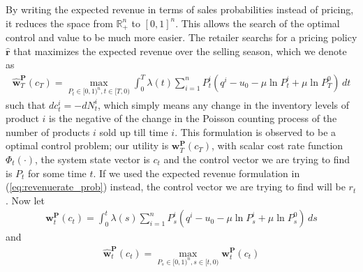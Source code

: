 By writing the expected revenue in terms of sales probabilities instead of pricing, it reduces the space from $\mathbb{R}^n_+$ to $[0,1]^n$. This allows the search of the 	optimal control and value to be much more easier. The retailer searchs for a pricing policy $\hat{\mathbf{r}}$ that maximizes the expected revenue over the selling season, which we denote as
\begin{align}
\hat{\mathbf{w}}_T^{\mathbf{P}}(c_T) = \max_{P_t \in [0,1)^n, t \in [T,0)}\int_{0}^{T}\lambda(t)\sum_{i=1}^{n}P_t^i\left(q^i-u_0-\mu \ln P_t^i+\mu \ln P_T^0\right)\, dt
\end{align}
such that $dc_t^i = -dN_t^i$, which simply means any change in the inventory levels of product $i$ is the negative of the change in the Poisson counting process of the number of products $i$ sold up till time $i$. This formulation is observed to be a optimal control problem; our utility is $\mathbf{w}_T^{\mathbf{P}}(c_T)$, with scalar cost rate function $\Phi_t(\cdot)$, the system state vector is $c_t$ and the control vector we are trying to find is $P_t$ for some time $t$. If we used the expected revenue formulation in (\ref{eq:revenuerate_prob}) instead, the control vector we are trying to find will be $r_t$. Now let
\begin{align}
\mathbf{w}_t^{\mathbf{P}}(c_t) = \int_{0}^{t}\lambda(s)\sum_{i=1}^{n}P_s^i\left(q^i-u_0-\mu \ln P_s^i+\mu \ln P_s^0\right)\, ds
\end{align}
and 
\begin{align}
\hat{\mathbf{w}}_t^{\mathbf{P}}(c_t) = \max_{P_s \in [0,1)^n, s \in [t,0)} \mathbf{w}_t^{\mathbf{P}}(c_t)
\end{align}



